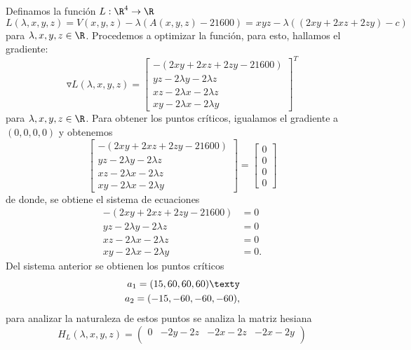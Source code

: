\documentclass[a4,11pt]{aleph-examen}
\begin{document}
\begin{preguntas}
\begin{respuesta}
\begin{respuesta}
\begin{respuesta}
\begin{enumerate}
\begin{respuesta}

    Definamos la función $L:\R^4 \rightarrow \R$
    \[
        L(\lambda,x,y,z)=V(x,y,z)-\lambda (A(x,y,z)-21600)=xyz-\lambda ((2xy+2xz+2zy)-c)
    \]
    para $\lambda, x,y,z \in \R$. Procedemos a optimizar la función, para esto, hallamos el gradiente:
    \[
        \triangledown L(\lambda,x,y,z)=
        \left[
        \begin{array}{c}
		-(2xy+2xz+2zy-21600)\\
		yz-2\lambda y-2 \lambda z\\
        xz-2\lambda x-2\lambda z\\
        xy-2\lambda x-2\lambda y
		\end{array} 
        \right]^T
    \]
    para $\lambda, x,y,z \in \R$. Para obtener los puntos críticos, igualamos el gradiente a $(0,0,0,0)$ y obtenemos
    \[
        \left[
        \begin{array}{c}
		-(2xy+2xz+2zy-21600)\\
		yz-2\lambda y-2 \lambda z\\
        xz-2\lambda x-2\lambda z\\
        xy-2\lambda x-2\lambda y
		\end{array} 
        \right]=
        \left[
        \begin{array}{c}
        0\\
        0\\
        0\\
        0
        \end{array} 
        \right]
    \]
    de donde, se obtiene el sistema de ecuaciones
    \begin{align*}
        -(2xy+2xz+2zy-21600)&=0\\
        yz-2\lambda y-2 \lambda z&=0\\
        xz-2\lambda x-2\lambda z&=0\\
        xy-2\lambda x-2\lambda y&=0.
    \end{align*}
    Del sistema anterior se obtienen los puntos críticos
    \begin{align*}
        a_1=(15,60,60,60) \texty\\
        a_2=(-15,-60,-60,-60),
    \end{align*}
    para analizar la naturaleza de estos puntos se analiza la matriz hesiana
    \[
        H_L(\lambda, x,y,z)=
        \begin{pmatrix}
            0 & -2y-2z & -2x-2z & -2x-2y\\

\end{pmatrix}\]
\end{respuesta}
\end{enumerate}
\end{respuesta}
\end{respuesta}
\end{respuesta}
\end{preguntas}
\end{document}
